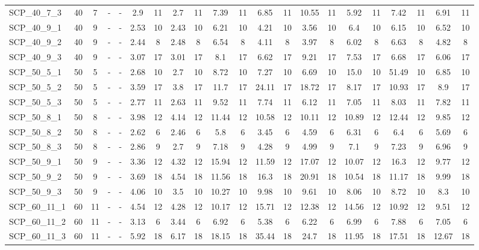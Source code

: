 \begin{sidewaystable}[!ht]
{\begin{tabular}{lcccccccccccccccccccc}
SCP\_40\_7\_3 & 40 & 7 &  - &  - & 2.9 & 11 & 2.7 & 11 & 7.39 & 11 & 6.85 & 11 & 10.55 & 11 & 5.92 & 11 & 7.42 & 11 & 6.91 & 11 \\
SCP\_40\_9\_1 & 40 & 9 &  - &  - & 2.53 & 10 & 2.43 & 10 & 6.21 & 10 & 4.21 & 10 & 3.56 & 10 & 6.4 & 10 & 6.15 & 10 & 6.52 & 10 \\
SCP\_40\_9\_2 & 40 & 9 &  - &  - & 2.44 & 8 & 2.48 & 8 & 6.54 & 8 & 4.11 & 8 & 3.97 & 8 & 6.02 & 8 & 6.63 & 8 & 4.82 & 8 \\
SCP\_40\_9\_3 & 40 & 9 &  - &  - & 3.07 & 17 & 3.01 & 17 & 8.1 & 17 & 6.62 & 17 & 9.21 & 17 & 7.53 & 17 & 6.68 & 17 & 6.06 & 17 \\
SCP\_50\_5\_1 & 50 & 5 &  - &  - & 2.68 & 10 & 2.7 & 10 & 8.72 & 10 & 7.27 & 10 & 6.69 & 10 & 15.0 & 10 & 51.49 & 10 & 6.85 & 10 \\
SCP\_50\_5\_2 & 50 & 5 &  - &  - & 3.59 & 17 & 3.8 & 17 & 11.7 & 17 & 24.11 & 17 & 18.72 & 17 & 8.17 & 17 & 10.93 & 17 & 8.9 & 17 \\
SCP\_50\_5\_3 & 50 & 5 &  - &  - & 2.77 & 11 & 2.63 & 11 & 9.52 & 11 & 7.74 & 11 & 6.12 & 11 & 7.05 & 11 & 8.03 & 11 & 7.82 & 11 \\
SCP\_50\_8\_1 & 50 & 8 &  - &  - & 3.98 & 12 & 4.14 & 12 & 11.44 & 12 & 10.58 & 12 & 10.11 & 12 & 10.89 & 12 & 12.44 & 12 & 9.85 & 12 \\
SCP\_50\_8\_2 & 50 & 8 &  - &  - & 2.62 & 6 & 2.46 & 6 & 5.8 & 6 & 3.45 & 6 & 4.59 & 6 & 6.31 & 6 & 6.4 & 6 & 5.69 & 6 \\
SCP\_50\_8\_3 & 50 & 8 &  - &  - & 2.86 & 9 & 2.7 & 9 & 7.18 & 9 & 4.28 & 9 & 4.99 & 9 & 7.1 & 9 & 7.23 & 9 & 6.96 & 9 \\
SCP\_50\_9\_1 & 50 & 9 &  - &  - & 3.36 & 12 & 4.32 & 12 & 15.94 & 12 & 11.59 & 12 & 17.07 & 12 & 10.07 & 12 & 16.3 & 12 & 9.77 & 12 \\
SCP\_50\_9\_2 & 50 & 9 &  - &  - & 3.69 & 18 & 4.54 & 18 & 11.56 & 18 & 16.3 & 18 & 20.91 & 18 & 10.54 & 18 & 11.17 & 18 & 9.99 & 18 \\
SCP\_50\_9\_3 & 50 & 9 &  - &  - & 4.06 & 10 & 3.5 & 10 & 10.27 & 10 & 9.98 & 10 & 9.61 & 10 & 8.06 & 10 & 8.72 & 10 & 8.3 & 10 \\
SCP\_60\_11\_1 & 60 & 11 &  - &  - & 4.54 & 12 & 4.28 & 12 & 10.17 & 12 & 15.71 & 12 & 12.38 & 12 & 14.56 & 12 & 10.92 & 12 & 9.51 & 12 \\
SCP\_60\_11\_2 & 60 & 11 &  - &  - & 3.13 & 6 & 3.44 & 6 & 6.92 & 6 & 5.38 & 6 & 6.22 & 6 & 6.99 & 6 & 7.88 & 6 & 7.05 & 6 \\
SCP\_60\_11\_3 & 60 & 11 &  - &  - & 5.92 & 18 & 6.17 & 18 & 18.15 & 18 & 35.44 & 18 & 24.7 & 18 & 11.95 & 18 & 17.51 & 18 & 12.67 & 18 \\

\end{tabular}}
\end{sidewaystable}
